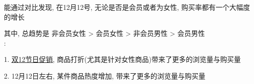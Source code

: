 \documentclass[a4paper]{article}
\begin{document}
能通过对比发现, 在12月12号, 无论是否是会员或者为女性, 购买率都有一个大幅度的增长

其中, 总趋势是 非会员女性 > 会员女性 > 非会员男性 > 会员男性\\

{}: 

1. \href{https://baike.baidu.com/item/%E5%8F%8C%E5%8D%81%E4%BA%8C%E8%B4%AD%E7%89%A9%E7%8B%82%E6%AC%A2%E8%8A%82/23196918}{\underline{双12节日促销}}, 商品打折(尤其是针对女性商品)带来了更多的浏览量与购买量

2. 12月12日左右, 某件商品热度增加, 带来了更多的浏览量与购买量
\end{document}
